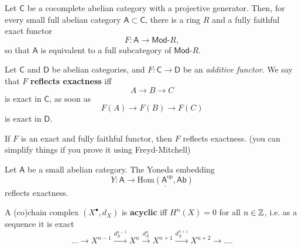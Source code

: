 \begin{thm}[]
	Let $\mathsf{C}$ be a cocomplete abelian category with a projective generator.
	Then, for every small full abelian category $\mathsf{A} \subset \mathsf{C}$,
	there is a ring $R$ and a fully faithful exact functor
	\begin{equation}
	F: \mathsf{A} \to \mathsf{Mod}\text{-}R
	,\end{equation} 
	so that $\mathsf{A}$ is equivalent to a full subcategory of $\mathsf{Mod}\text{-}R$.
\end{thm}

\begin{defn}
	Let $\mathsf{C}$ and $\mathsf{D}$ be abelian categories, and
	$F\colon \mathsf{C} \to \mathsf{D}$ be an {\em additive functor}.
	We say that $F$ \textbf{reflects exactness} iff
	\begin{equation}
	A \to B \to C
	\end{equation} 
	is exact in $\mathsf{C}$, as soon as
	\begin{equation}
		F(A) \to F(B) \to F(C)
	\end{equation} 
	is exact in $\mathsf{D}$.
\end{defn}

\begin{lem}
	If $F$ is an exact and fully faithful functor,
	then $F$ reflects exactness.
	(you can simplify things if you prove it using Freyd-Mitchell)
\end{lem} 

\begin{prop}
	Let $\mathsf{A}$ be a small abelian category.
	The Yoneda embedding
	\begin{equation}
		Y\colon \mathsf{A} \to \underline{\mathrm{Hom}\left( \mathsf{A}^{op}, \mathsf{Ab} \right)}
	\end{equation} 
	reflects exactness.
\end{prop} 

\begin{defn}
	A (co)chain complex $\left( X^{\bullet}, d_{X} \right)$ is \textbf{acyclic} iff 
	$H^n(X) = 0$ for all $n \in \mathbb{Z}$, i.e. as a sequence it is exact
	\begin{equation}
	\ldots \to X^{n-1} \xrightarrow{d_X^{n-1}} X^n \xrightarrow{d_X^n} 
	X^{n+1} \xrightarrow{d_X^{n+1}} X^{n+2} \to \ldots
	.\end{equation} 
\end{defn}
